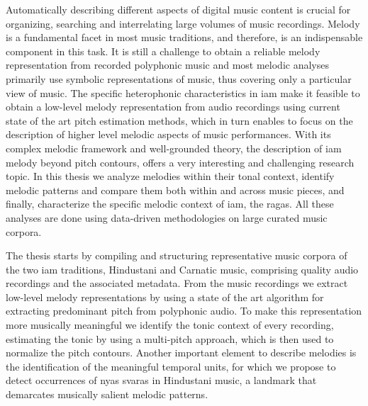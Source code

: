
Automatically describing different aspects of digital music content is crucial for organizing, searching and interrelating large volumes of music recordings. Melody is a fundamental facet in most music traditions, and therefore, is an indispensable component in this task. It is still a challenge  to obtain a reliable melody representation from recorded polyphonic music and most melodic analyses primarily use symbolic representations of music, thus covering only a particular view of music. The specific heterophonic characteristics in \gls{iam} make it feasible to obtain a low-level melody representation from audio recordings using current state of the art pitch estimation methods, which in turn enables to focus on the description of higher level melodic aspects of music performances. With its complex melodic framework and well-grounded theory, the description of \gls{iam} melody  beyond pitch contours, offers a very interesting and challenging research topic. In this thesis we analyze melodies within their tonal context, identify melodic patterns and compare them both within and across music pieces, and finally, characterize the specific melodic context of \gls{iam}, the \glspl{raga}. All these analyses are done using data-driven methodologies on large curated music corpora. 

The thesis starts by compiling and structuring representative music corpora of the two \gls{iam} traditions, Hindustani and Carnatic music, comprising quality audio recordings and the associated metadata. From the music recordings we extract low-level melody representations by using a state of the art algorithm for extracting predominant pitch from polyphonic audio. To make this representation more musically meaningful we identify the tonic context of every recording, estimating the  tonic by using a multi-pitch approach, which is then used to normalize the pitch contours. Another important element to describe melodies is the identification of the meaningful temporal units, for which we propose to detect occurrences of \gls{nyas} \glspl{svara} in Hindustani music, a landmark that demarcates musically salient melodic patterns.

